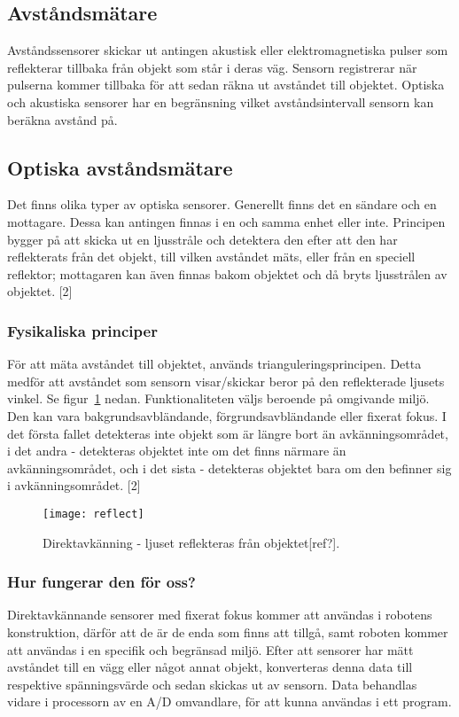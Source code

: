 \documentclass[11pt]{article}
\begin{document}
\begin{flushleft}
\section{Avståndsmätare}
Avståndssensorer skickar ut antingen akustisk eller elektromagnetiska pulser som reflekterar tillbaka från objekt som står i deras väg. Sensorn registrerar när pulserna kommer tillbaka för att sedan räkna ut avståndet till objektet. Optiska och akustiska sensorer har en begränsning vilket avståndsintervall sensorn kan beräkna avstånd på.
 
\subsection{Optiska avståndsmätare}
Det finns olika typer av optiska sensorer. Generellt finns det en sändare och en mottagare. Dessa kan antingen finnas i en och samma enhet eller inte. Principen bygger på att skicka ut en ljusstråle och detektera den efter att den har reflekterats från det objekt, till vilken avståndet mäts, eller från en speciell reflektor; mottagaren kan även finnas bakom objektet och då bryts ljusstrålen av objektet. [2]

\subsubsection{Fysikaliska principer} 
För att mäta avståndet till objektet, används trianguleringsprincipen. Detta medför att avståndet som sensorn visar/skickar beror på den reflekterade ljusets vinkel. Se figur~\ref{fig:reflect} nedan. Funktionaliteten väljs beroende på omgivande miljö. Den kan vara bakgrundsavbländande, förgrundsavbländande eller fixerat fokus. I det första fallet detekteras inte objekt som är längre bort än avkänningsområdet, i det andra - detekteras objektet inte om det finns närmare än avkänningsområdet, och i det sista - detekteras objektet bara om den befinner sig i avkänningsområdet. [2]

\begin{figure}[h]
\centering
\texttt{[image: reflect]}
\caption{Direktavkänning - ljuset reflekteras från objektet[ref?].}
\label{fig:reflect}
\end{figure}

\subsubsection{Hur fungerar den för oss?}
Direktavkännande sensorer med fixerat fokus kommer att användas i robotens konstruktion, därför att de är de enda som finns att tillgå, samt roboten kommer att användas i en specifik och begränsad miljö. Efter att sensorer har mätt avståndet till en vägg eller något annat objekt, konverteras denna data till respektive spänningsvärde och sedan skickas ut av sensorn. Data behandlas vidare i processorn av en A/D omvandlare, för att kunna användas i ett program.


\end{flushleft}
\end{document}
